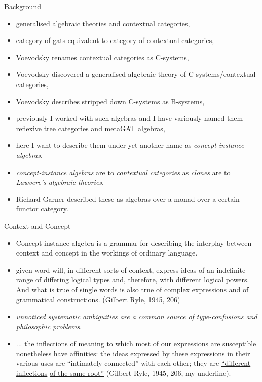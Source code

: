 \begin{frame}{Background}
\begin{itemize}
\item generalised algebraic theories and contextual categories,
\item category of gats equivalent to category of contextual categories,
\item Voevodsky renames contextual categories as C-systems,
\item Voevodsky discovered a generalised algebraic theory of C-systems/contextual categories,
\item Voevodsky describes stripped down  C-systems as B-systems,
\item previously I worked with such algebras and I have variously named them reflexive tree categories and metaGAT algebras,
\item here I want to describe them under yet another name as \textit{concept-instance algebras},
\item \textit{concept-instance algebras} are to \textit{contextual categories} as \textit{clones} are to \textit{Lawvere's  algebraic theories}.
\item Richard Garner described these as algebras over a monad over a certain functor category.
\end{itemize}
\end{frame}

\begin{frame}{Context and Concept}
\begin{itemize}
	\item Concept-instance algebra is a grammar for describing the interplay between context and concept in the workings of ordinary language.
\pause	\item
\begin{tightquote}
[a] given word will, in different sorts of context, express ideas of an indefinite range of differing logical types and, therefore, with different logical powers. And what is true of single words is also true of complex expressions and of grammatical constructions. (Gilbert Ryle, 1945, 206)
\end{tightquote}
\medskip
\pause
\item \textit{unnoticed systematic ambiguities are a common source of type-confusions and philosophic problems}.
\end{itemize}
\end{frame}
\begin{frame}
\begin{itemize}
\item 
\begin{tightquote}
... the inflections of meaning to which most of our expressions are susceptible nonetheless have affinities: the ideas expressed by these expressions in their various uses are “intimately connected” with each other; 
they are \underline{“different inflections} \underline{of the same root”} (Gilbert Ryle, 1945, 206, my underline).
\end{tightquote}

\end{itemize}
\end{frame}


